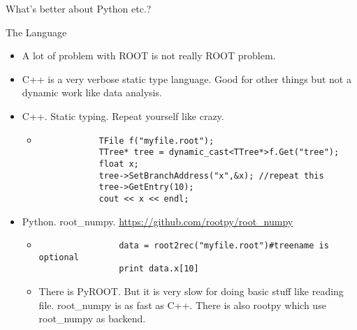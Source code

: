 \documentclass{beamer}
\begin{document}
\begin{frame}[c]
		\centerline{\Large What's better about Python etc.?}
\end{frame}

\begin{frame}[fragile]{The Language}
	\begin{itemize}
	\item A lot of problem with ROOT is not really ROOT problem.
	\item C++ is a very verbose static type language. Good for other things but not a dynamic work like data analysis.
	\item C++. Static typing. Repeat yourself like crazy.
		\begin{itemize}
		\item
		\begin{verbatim}
			TFile f("myfile.root");
			TTree* tree = dynamic_cast<TTree*>f.Get("tree");
			float x;
			tree->SetBranchAddress("x",&x); //repeat this
			tree->GetEntry(10);
			cout << x << endl;
		\end{verbatim}
		\end{itemize}
	\item Python. root\_numpy. \url{https://github.com/rootpy/root_numpy}
		\begin{itemize}
			\item 
			\begin{verbatim}
				data = root2rec("myfile.root")#treename is optional
				print data.x[10]
			\end{verbatim}
			\item There is PyROOT. But it is very slow for doing basic stuff like reading file. root\_numpy is as fast as C++. There is also rootpy which use root\_numpy as backend.
		\end{itemize}
	\end{itemize}
\end{frame}
\end{document}
